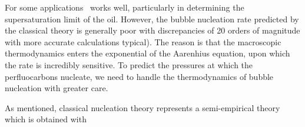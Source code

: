 








 For some applications \cnt\ works well, particularly in determining the supersaturation limit of the oil.
 However,  the bubble nucleation rate predicted by the classical theory 
 is generally poor\cite{Talanquer1994} with discrepancies of 20 orders of magnitude with more accurate calculations typical\cite{Talanquer1994}).
 The reason is that the macroscopic thermodynamics enters  the exponential of the Aarenhius  equation,
 upon which the rate is incredibly sensitive.
 To predict the pressures at which the perfluocarbons nucleate,
 we need to handle the thermodynamics of bubble nucleation with greater care.



As mentioned, classical nucleation theory represents a semi-empirical theory
which is obtained with


